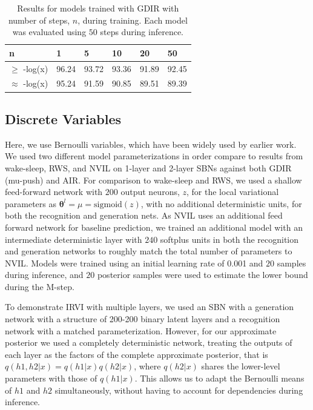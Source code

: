 \documentclass{article} %
\newcommand{\vects}[1]{\boldsymbol{#1}}
\newcommand{\TT}[0]{\vects{\theta}}
\newcommand{\sigmoid}{\text{sigmoid}}
\begin{document}
\begin{table}
\begin{tabular}{ | m{1.4cm} | m{1cm} | m{1cm} | m{1cm} | m{1cm} | m{1cm} |}
\hline
n & 1 & 5 & 10 & 20 & 50 \\
\hline
$\ge$ -log(x) & 96.24 & 93.72 & 93.36 & 91.89 & 92.45\\
\hline
$\approx$ -log(x) & 95.24 & 91.59 & 90.85 & 89.51 & 89.39 \\
\hline
\end{tabular}
\caption{Results for models trained with GDIR with number of steps, $n$, during training. Each model was evaluated using $50$ steps during inference.}
\label{table:cont_step}
\end{table}

\subsection{Discrete Variables}
Here, we use Bernoulli variables, which have been widely used by earlier work. We used two different model parameterizations in order compare to results from wake-sleep, RWS, and NVIL on 1-layer and 2-layer SBNs against both GDIR (mu-push) and AIR. For comparison to wake-sleep and RWS, we used a shallow
feed-forward network with $200$ output neurons, $z$, for the local variational parameters as $\TT^l = \mu = \sigmoid(z)$, with no additional deterministic units, for both the recognition and generation nets.
As NVIL uses an additional feed forward network for baseline prediction, we trained an additional model with
an intermediate deterministic layer with $240$ softplus units in both the recognition and generation
networks to roughly match the total number of parameters to NVIL. Models
were trained using an initial learning rate of \num{0.001} and $20$ samples
during inference, and $20$ posterior samples were used to estimate the lower bound during the
M-step.

To demonstrate IRVI with multiple layers, we used an SBN with a generation network with a structure of 200-200 binary latent layers and a recognition network with a matched parameterization. However, for our approximate posterior we used a completely deterministic network, treating the outputs of each layer as the factors of the complete approximate posterior, that is $q(h1, h2 | x) = q(h1|x) q(h2|x)$, where $q(h2|x)$ shares the lower-level parameters with those of $q(h1|x)$. This allows us to adapt the Bernoulli means of $h1$ and $h2$ simultaneously, without having to account for dependencies during inference.
\end{document}
